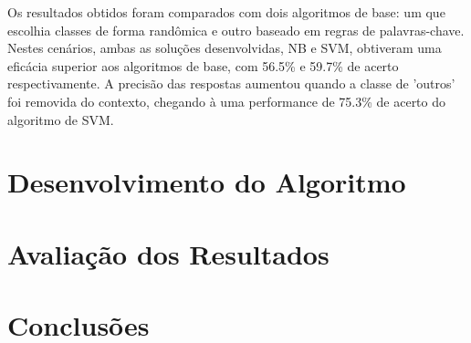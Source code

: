 \documentclass[
	12pt,				%
	openright,			%
	oneside,			%
	a4paper,			%
	english,			%
	spanish,			%
	brazil				%
	]{abntex2}
\begin{document}
Os resultados obtidos foram comparados com dois algoritmos de base: um que escolhia classes de forma randômica e outro baseado em regras de palavras-chave. Nestes cenários, ambas as soluções desenvolvidas, NB e SVM, obtiveram uma eficácia superior aos algoritmos de base, com 56.5\% e 59.7\% de acerto respectivamente. A precisão das respostas aumentou quando a classe de 'outros' foi removida do contexto, chegando à uma performance de 75.3\% de acerto do algoritmo de SVM. 

	
	\chapter{Desenvolvimento do Algoritmo}
	\chapter{Avaliação dos Resultados}
	\chapter{Conclusões}
	 
	

\postextual



	
\end{document}
